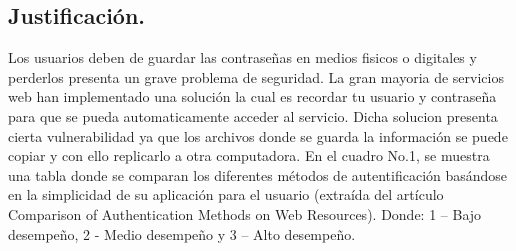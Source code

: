 \documentclass[12pt, a4paper, titlepage]{article}
\begin{document}
		\subsection{Justificación.}
			Los usuarios deben de guardar las contraseñas en medios fisicos o digitales y perderlos presenta un grave problema de seguridad. La gran mayoria de servicios web han implementado una solución la cual es recordar tu usuario y contraseña para que se pueda automaticamente acceder al servicio. Dicha solucion presenta cierta vulnerabilidad ya que los archivos donde se guarda la información se puede copiar y con ello replicarlo a otra computadora.
			En el cuadro No.1, se muestra una tabla donde se comparan los diferentes métodos de autentificación basándose en la simplicidad de su aplicación para el usuario (extraída del artículo Comparison of Authentication Methods on Web Resources). Donde: 1 – Bajo desempeño, 2 - Medio desempeño y 3 – Alto desempeño.
			
\end{document}
